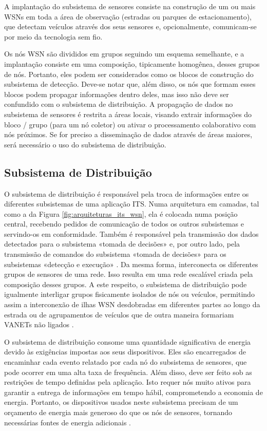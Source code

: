 \documentclass[
	12pt,				%
	oneside,			%
	a4paper,			%
	english,			%
	brazil				%
	]{abntex2ppgsi}
\begin{document}
A implantação do subsistema de sensores consiste na construção de um ou mais WSNs em toda a área de observação (estradas ou parques de estacionamento), que detectam veículos através dos seus sensores e, opcionalmente, comunicam-se por meio da tecnologia sem fio. 

Os nós WSN são divididos em grupos seguindo um esquema semelhante, e a implantação consiste em uma composição, tipicamente homogênea, desses grupos de nós. Portanto, eles podem ser considerados como os blocos de construção do subsistema de detecção. Deve-se notar que, além disso, os nós que formam esses blocos podem propagar informações dentro deles, mas isso não deve ser confundido com o subsistema de distribuição. A propagação de dados no subsistema de sensores é restrita a áreas locais, visando extrair informações do bloco / grupo (para um nó coletor) ou ativar o processamento colaborativo com nós próximos. Se for preciso a disseminação de dados através de áreas maiores, será necessário o uso do subsistema de distribuição.

\subsection{Subsistema de Distribuição}

O subsistema de distribuição é responsável pela troca de informações entre os diferentes subsistemas de uma aplicação ITS. Numa arquitetura em camadas, tal como a da Figura \ref{fig:arquiteturas_its_wsn}, ela é colocada numa posição central, recebendo pedidos de comunicação de todos os outros subsistemas e servindo-os em conformidade. Também é responsável pela transmissão dos dados detectados para o subsistema «tomada de decisões» e, por outro lado, pela transmissão de comandos do subsistema «tomada de decisões» para os subsistemas «detecção e execução» \cite{sung2007collision}. Da mesma forma, interconecta os diferentes grupos de sensores de uma rede. Isso resulta em uma rede escalável criada pela composição desses grupos. A este respeito, o subsistema de distribuição pode igualmente interligar grupos fisicamente isolados de nós ou veículos, permitindo assim a interconexão de ilhas WSN desdobradas em diferentes partes ao longo da estrada \cite{weingartner2007prototype} ou de agrupamentos de veículos que de outra maneira formariam VANETs não ligados \cite{tripp2010performance} .

O subsistema de distribuição consome uma quantidade significativa de energia devido às exigências impostas aos seus dispositivos. Eles são encarregados de encaminhar cada evento relatado por cada nó do subsistema de sensores, que pode ocorrer em uma alta taxa de frequência. Além disso, deve ser feito sob as restrições de tempo definidas pela aplicação. Isto requer nós muito ativos para garantir a entrega de informações em tempo hábil, comprometendo a economia de energia. Portanto, os dispositivos usados neste subsistema precisam de um orçamento de energia mais generoso do que os nós de sensores, tornando necessárias fontes de energia adicionais \cite{losilla2011comprehensive}.
\end{document}
